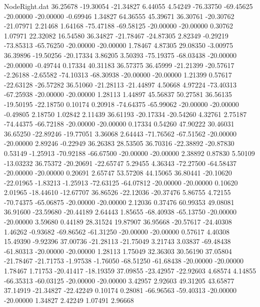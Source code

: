 \begin{filecontents}{NodeRight.dat}
  36.25678  -19.30054  -21.34827     6.44055    4.54249  -76.33750  -69.45625  -20.00000  -20.00000   -0.69946    1.34827   64.36555   45.39671
  36.30761  -20.30762  -21.07971     2.21468    1.64168  -75.47188  -69.58125  -20.00000  -20.00000    0.30762    1.07971   22.32082   16.54580
  36.34827  -21.78467  -24.87305     2.82349   -0.29219  -73.85313  -65.76250  -20.00000  -20.00000    1.78467    4.87305   29.08350   -3.00975
  36.39896  -19.50256  -20.17334     3.86205    3.50393  -75.19375  -68.03438  -20.00000  -20.00000   -0.49744    0.17334   40.31183   36.57375
  36.45999  -21.21399  -20.57617    -2.26188   -2.65582  -74.10313  -68.30938  -20.00000  -20.00000    1.21399    0.57617  -22.63128  -26.57282
  36.51060  -21.28113  -21.44897     4.50668    4.97224  -73.40313  -67.25938  -20.00000  -20.00000    1.28113    1.44897   45.56837   50.27581
  36.56135  -19.50195  -22.18750     0.10174    0.20918  -74.64375  -65.99062  -20.00000  -20.00000   -0.49805    2.18750    1.02842    2.11439
  36.61193  -20.17334  -20.54260     4.32761    2.75187  -74.44375  -66.72188  -20.00000  -20.00000    0.17334    0.54260   47.90222   30.46031
  36.65250  -22.89246  -19.77051     3.36068    2.64443  -71.76562  -67.51562  -20.00000  -20.00000    2.89246   -0.22949   36.26383   28.53505
  36.70316  -22.38892  -20.87830     0.53149   -1.25913  -70.92188  -66.67500  -20.00000  -20.00000    2.38892    0.87830    5.50109  -13.03232
  36.75372  -20.20691  -22.65747     5.29455    4.36343  -72.27500  -64.58437  -20.00000  -20.00000    0.20691    2.65747   53.57208   44.15065
  36.80441  -20.10620  -22.01965    -1.83213   -1.25913  -72.63125  -64.07812  -20.00000  -20.00000    0.10620    2.01965  -18.44610  -12.67707
  36.86526  -22.12036  -20.37476     5.86755    4.72155  -70.74375  -65.06875  -20.00000  -20.00000    2.12036    0.37476   60.99353   49.08081
  36.91600  -23.59680  -20.44189     2.64443    1.85655  -68.40938  -65.13750  -20.00000  -20.00000    3.59680    0.44189   28.31524   19.87907
  36.95668  -20.57617  -24.40308     1.46262   -0.93682  -69.86562  -61.31250  -20.00000  -20.00000    0.57617    4.40308   15.49390   -9.92396
  37.00736  -21.28113  -21.75049     3.21743    3.03837  -69.48438  -61.80313  -20.00000  -20.00000    1.28113    1.75049   32.36303   30.56190
  37.05804  -21.78467  -21.71753    -1.97538   -1.76050  -68.51250  -61.68438  -20.00000  -20.00000    1.78467    1.71753  -20.41417  -18.19359
  37.09855  -23.42957  -22.92603     4.68574    4.14855  -66.35313  -60.03125  -20.00000  -20.00000    3.42957    2.92603   49.31205   43.65877
  37.14919  -21.34827  -22.42249     0.10174    0.28081  -66.96563  -59.40313  -20.00000  -20.00000    1.34827    2.42249    1.07491    2.96668

\end{filecontents}
